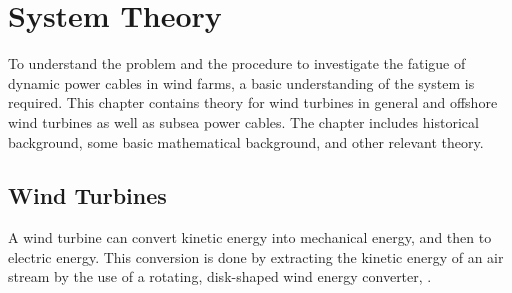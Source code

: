 \chapter{System Theory}
\label{chap:sysdes}
To understand the problem and the procedure to investigate the fatigue of dynamic power cables in wind farms, a basic understanding of the system is required. This chapter contains theory for wind turbines in general and offshore wind turbines as well as subsea power cables. The chapter includes historical background, some basic mathematical background, and other relevant theory. 
\section{Wind Turbines}
A wind turbine can convert kinetic energy into mechanical energy, and then to electric energy. This conversion is done by extracting the kinetic energy of an air stream by the use of a rotating, disk-shaped wind energy converter, \cite{Hau2013}.

